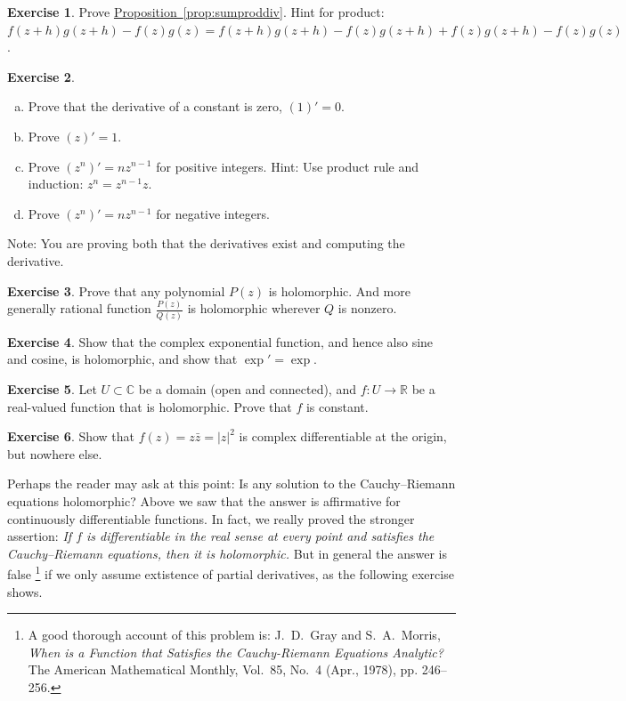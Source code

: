 \documentclass[12pt,openany]{book}
\newcommand{\sabs}[1]{\lvert {#1} \rvert}
\newcommand{\C}{{\mathbb{C}}}
\newcommand{\R}{{\mathbb{R}}}
\theoremstyle{plain}
\theoremstyle{remark}
\theoremstyle{definition}
\newenvironment{exbox}{%
    \def\FrameCommand{\vrule width 1pt \relax\hspace {10pt}}%
    \MakeFramed {\advance \hsize -\width \FrameRestore }%
}{%
    \endMakeFramed
}
\newenvironment{exparts}{%
    \leavevmode\begin{enumerate}[a),noitemsep,topsep=0pt,parsep=0pt,partopsep=0pt]
}{%
    \end{enumerate}
}
\theoremstyle{exercise}
\newtheorem{exercise}{Exercise}[section]
\theoremstyle{example}
\newcommand{\propref}[1]{\hyperref[#1]{Proposition~\ref*{#1}}}
\begin{document}
\begin{exbox}
\begin{exercise}
Prove \propref{prop:sumproddiv}.
Hint for product: 
$f(z+h)g(z+h) - f(z)g(z) =
f(z+h)g(z+h) - f(z)g(z+h) +
f(z)g(z+h) - f(z)g(z)$.
\end{exercise}

\begin{exercise}
\begin{samepage}
\begin{exparts}
\item
Prove that the derivative of a constant is zero, $(1)' = 0$.
\item
Prove $(z)' = 1$.
\item
Prove $(z^n)' = n z^{n-1}$ for positive integers.  Hint: Use product rule
and induction: $z^n = z^{n-1} z$.
\item
Prove $(z^n)' = n z^{n-1}$ for negative integers.
\end{exparts}
Note: You are proving both that the derivatives exist and
computing the derivative.
\end{samepage}
\end{exercise}

\begin{exercise}
Prove that any polynomial $P(z)$ is holomorphic.  And more generally
rational function $\frac{P(z)}{Q(z)}$ is holomorphic wherever $Q$ is
nonzero.
\end{exercise}

\begin{exercise}
Show that the complex exponential function, and hence also sine and cosine,
is holomorphic, and show that $\exp' = \exp$.
\end{exercise}

\begin{exercise}
Let $U \subset \C$ be a domain (open and connected),
and $f \colon U \to \R$ be a real-valued function that is holomorphic.
Prove that $f$ is constant.
\end{exercise}

\begin{exercise}
Show that $f(z) = z \bar{z} = \sabs{z}^2$ is complex differentiable
at the origin, but nowhere else.
\end{exercise}
\end{exbox}

Perhaps the reader may ask at this point: Is any solution to
the Cauchy--Riemann equations holomorphic?  Above we saw that the answer
is affirmative for continuously differentiable functions.  In fact, we
really proved the stronger assertion: \emph{If $f$ is differentiable in the
real sense at every point and satisfies the Cauchy--Riemann equations, then
it is holomorphic.}
But in general the answer is false%
\footnote{%
A good thorough account of this problem is:
J.\ D.\ Gray and  S.\ A.\ Morris,
\emph{When is a Function that Satisfies the Cauchy-Riemann Equations
Analytic?}  The American Mathematical Monthly, Vol.\ 85, No.\ 4 (Apr.,
1978), pp. 246--256.} if we only assume extistence of partial derivatives,
as the following exercise shows.
\end{document}
